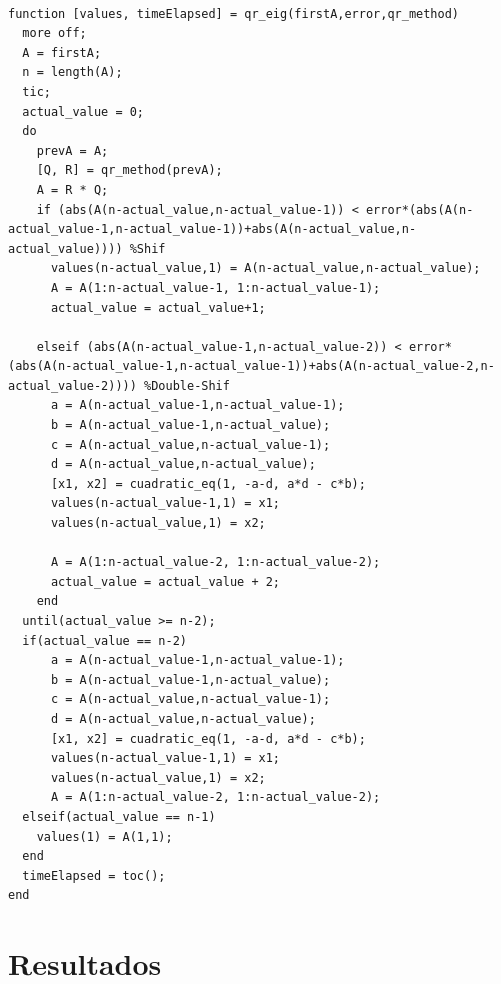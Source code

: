 \documentclass[a4paper,10pt,spanish]{article}
\begin{document}
\begin{lstlisting}[caption = Obtención de Autovalores]

function [values, timeElapsed] = qr_eig(firstA,error,qr_method)
  more off;
  A = firstA;
  n = length(A);
  tic;
  actual_value = 0;
  do
    prevA = A;
    [Q, R] = qr_method(prevA);
    A = R * Q;
    if (abs(A(n-actual_value,n-actual_value-1)) < error*(abs(A(n-actual_value-1,n-actual_value-1))+abs(A(n-actual_value,n-actual_value)))) %Shif
      values(n-actual_value,1) = A(n-actual_value,n-actual_value);
      A = A(1:n-actual_value-1, 1:n-actual_value-1);
      actual_value = actual_value+1;

    elseif (abs(A(n-actual_value-1,n-actual_value-2)) < error*(abs(A(n-actual_value-1,n-actual_value-1))+abs(A(n-actual_value-2,n-actual_value-2)))) %Double-Shif
      a = A(n-actual_value-1,n-actual_value-1);
      b = A(n-actual_value-1,n-actual_value);
      c = A(n-actual_value,n-actual_value-1);
      d = A(n-actual_value,n-actual_value);
      [x1, x2] = cuadratic_eq(1, -a-d, a*d - c*b);
      values(n-actual_value-1,1) = x1;
      values(n-actual_value,1) = x2;

      A = A(1:n-actual_value-2, 1:n-actual_value-2);
      actual_value = actual_value + 2;
    end
  until(actual_value >= n-2);
  if(actual_value == n-2)
      a = A(n-actual_value-1,n-actual_value-1);
      b = A(n-actual_value-1,n-actual_value);
      c = A(n-actual_value,n-actual_value-1);
      d = A(n-actual_value,n-actual_value);
      [x1, x2] = cuadratic_eq(1, -a-d, a*d - c*b);
      values(n-actual_value-1,1) = x1;
      values(n-actual_value,1) = x2;
      A = A(1:n-actual_value-2, 1:n-actual_value-2);
  elseif(actual_value == n-1)
    values(1) = A(1,1);
  end
  timeElapsed = toc();
end

\end{lstlisting}

\pagebreak

\section{Resultados}
\end{document}
